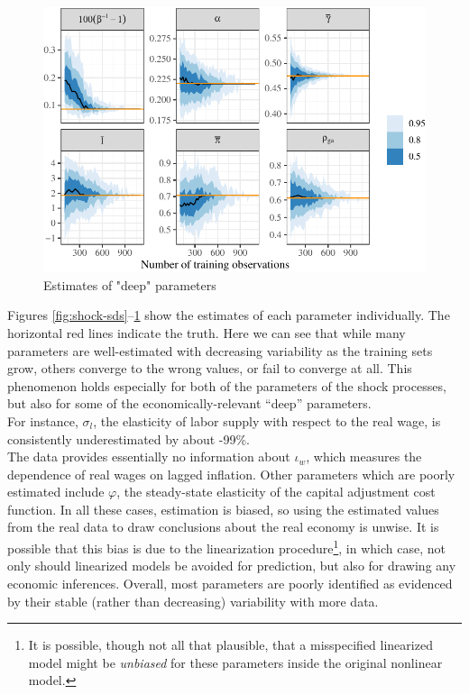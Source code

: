 \documentclass[11pt]{article}
\begin{document}
\begin{figure}[t]

{\centering \includegraphics{gfx/deep3-1} 

}

\caption{Estimates of "deep" parameters}\label{fig:deep3}
\end{figure}

Figures \ref{fig:shock-sds}--\ref{fig:deep3} show the estimates of each
parameter individually. The horizontal red lines indicate the truth.
Here we can see that while many parameters are well-estimated with
decreasing variability as the training sets grow, others converge to the
wrong values, or fail to converge at all. This phenomenon holds
especially for both of the parameters of the shock processes, but also
for some of the economically-relevant ``deep'' parameters.\\
For instance, \(\sigma_l\), the elasticity of labor supply with respect
to the real wage, is consistently underestimated by about -99\%.\\
The data provides essentially no information about \(\iota_w\), which
measures the dependence of real wages on lagged inflation. Other
parameters which are poorly estimated include \(\varphi\), the
steady-state elasticity of the capital adjustment cost function. In all
these cases, estimation is biased, so using the estimated values from
the real data to draw conclusions about the real economy is unwise. It
is possible that this bias is due to the linearization
procedure\footnote{It is possible, though not all that plausible, that a
  misspecified linearized model might be \emph{unbiased} for these
  parameters inside the original nonlinear model.}, in which case, not
only should linearized models be avoided for prediction, but also for
drawing any economic inferences. Overall, most parameters are poorly
identified as evidenced by their stable (rather than decreasing)
variability with more data.
\end{document}
